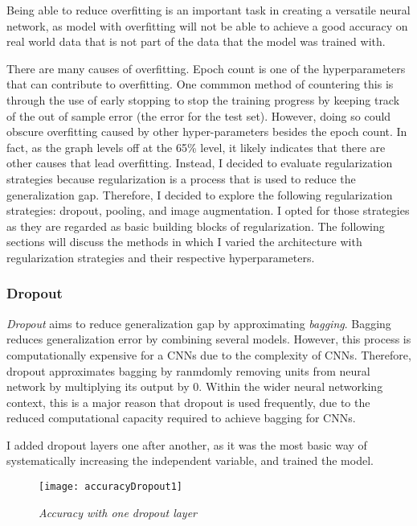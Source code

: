 \documentclass{article}
\begin{document}
Being able to reduce overfitting is an important task in creating a versatile neural network, as model with overfitting will not be able to achieve a good accuracy on real world data that is not part of the data that the model was trained with.

There are many causes of overfitting. Epoch count is one of the hyperparameters that can contribute to overfitting. One commmon method of countering this is through the use of early stopping to stop the training progress by keeping track of the out of sample error (the error for the test set). However, doing so could obscure overfitting caused by other hyper-parameters besides the epoch count.\autocite[9]{bengio12} In fact, as the graph levels off at the 65\% level, it likely indicates that there are other causes that lead overfitting. Instead, I decided to evaluate regularization strategies because regularization is a process that is used to reduce the generalization gap. Therefore, I decided to explore the following regularization strategies: dropout, pooling, and image augmentation. I opted for those strategies as they are regarded as basic building blocks of regularization.\autocite[228]{deep16} The following sections will discuss the methods in which I varied the architecture with regularization strategies and their respective hyperparameters.

\subsubsection{Dropout}
\emph{Dropout} aims to reduce generalization gap by approximating \emph{bagging}. Bagging reduces generalization error by combining several models. However, this process is computationally expensive for a CNNs due to the complexity of CNNs. Therefore, dropout approximates bagging by ranmdomly removing units from neural network by multiplying its output by 0.\autocite[258]{deep16} Within the wider neural networking context, this is a major reason that dropout is used frequently, due to the reduced computational capacity required to achieve bagging for CNNs.

I added dropout layers one after another, as it was the most basic way of systematically increasing the independent variable, and trained the model.

\begin{figure}[H]
    \begin{center}
        \texttt{[image: accuracyDropout1]}
        \caption{\small \sl Accuracy with one dropout layer}
    \end{center}
\end{figure}
\end{document}
